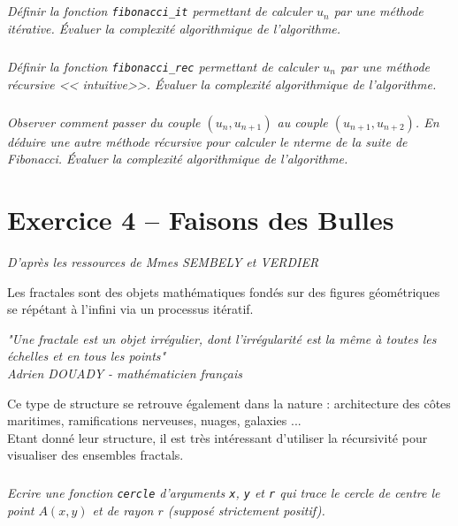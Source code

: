 \documentclass[10pt,fleqn]{article} %
\begin{document}
\begin{multicols}{2}
\subparagraph{}
\textit{Définir la fonction \texttt{fibonacci\_it} permettant de calculer $u_n$ par une méthode itérative. Évaluer la complexité algorithmique de l'algorithme.}

\subparagraph{}
\textit{Définir la fonction \texttt{fibonacci\_rec} permettant de calculer $u_n$ par une méthode récursive << intuitive>>. Évaluer la complexité algorithmique de l'algorithme.}


\subparagraph{}
\textit{Observer comment passer du couple $(u_n,u_{n+1})$ au couple $(u_{n+1},u_{n+2})$. En déduire une autre méthode récursive pour calculer le n\ieme terme de la suite de Fibonacci. Évaluer la complexité algorithmique de l'algorithme.}

\section*{Exercice 4 -- Faisons des Bulles}
\textit{ D'après les ressources de Mmes SEMBELY et VERDIER}
\setcounter{exo}{0}

Les fractales sont des objets mathématiques fondés sur des figures géométriques se répétant à l'infini via un processus itératif.
\begin{center}
\textit{ "Une fractale est un objet irrégulier, dont l'irrégularité est la même à toutes les échelles et en tous les points"
\\
Adrien DOUADY - mathématicien français}
\end{center}
Ce type de structure se retrouve également dans la nature : architecture des côtes maritimes, ramifications nerveuses, nuages, galaxies ...
\\
Etant donné leur structure, il est très intéressant d'utiliser la récursivité pour visualiser des ensembles fractals.
\\
\subparagraph{}
\textit{Ecrire une fonction \texttt{cercle} d'arguments \texttt{x}, \texttt{y} et \texttt{r} qui trace le cercle de centre le point $A(x, y)$ et de rayon $r$ (supposé strictement positif).}


\end{multicols}
\end{document}
